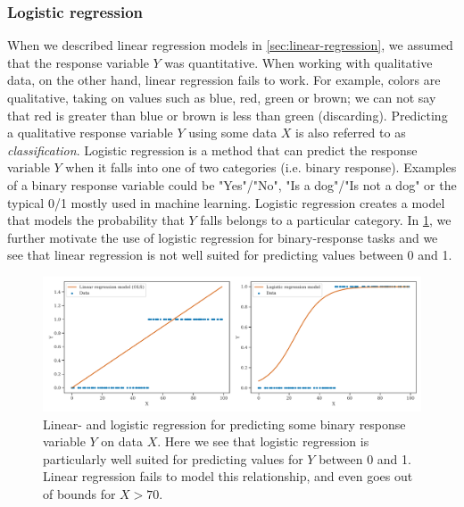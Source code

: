 \subsubsection{Logistic regression}
\label{sec:logistic-regression}
When we described linear regression models in \cref{sec:linear-regression}, we assumed that the response variable $Y$ was quantitative. When working with qualitative data, on the other hand, linear regression fails to work. For example, colors are qualitative, taking on values such as blue, red, green or brown; we can not say that red is greater than blue or brown is less than green (discarding). Predicting a qualitative response variable $Y$ using some data $X$ is also referred to as \textit{classification}. Logistic regression is a method that can predict the response variable $Y$ when it falls into one of two categories (i.e. binary response). Examples of a binary response variable could be "Yes"/"No", "Is a dog"/"Is not a dog" or the typical 0/1 mostly used in machine learning. Logistic regression creates a model that models the probability that $Y$ falls belongs to a particular category. In \cref{fig:logistic-regression-example}, we further motivate the use of logistic regression for binary-response tasks and we see that linear regression is not well suited for predicting values between 0 and 1.
\begin{figure}[H]
    \centering
    \includegraphics[width=\textwidth]{thesis/figures/logistic-regression-example.pdf}
    \caption{Linear- and logistic regression for predicting some binary response variable $Y$ on data $X$. Here we see that logistic regression is particularly well suited for predicting values for $Y$ between 0 and 1. Linear regression fails to model this relationship, and even goes out of bounds for $X > 70$.}
    \label{fig:logistic-regression-example}
\end{figure}

